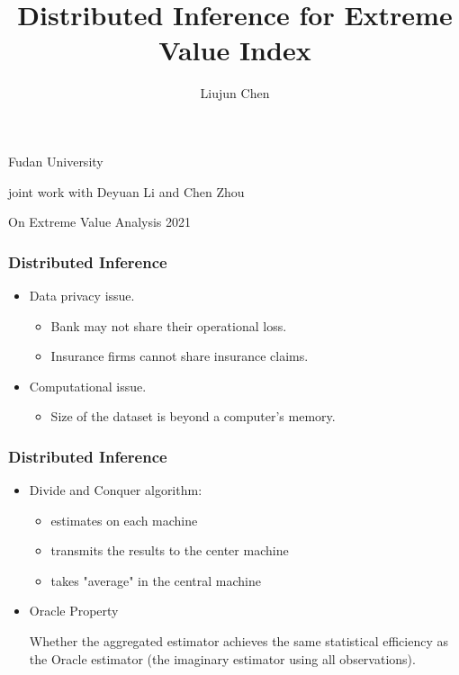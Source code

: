 \documentclass{beamer}
\title{Distributed Inference for Extreme Value Index}
\date{}
\author{Liujun Chen}
\begin{document}
\begin{frame}
\titlepage
\begin{center}
    \vspace{-17ex}


 Fudan University

    \bigskip

    joint work with Deyuan Li and Chen Zhou

    \bigskip
    On Extreme Value Analysis 2021
\end{center}
\end{frame}

\begin{frame}
    \frametitle{ Distributed Inference}

    


\begin{itemize}


    \item Data privacy issue.
    \medskip
    \begin{itemize}
        \item Bank may not share their operational loss.
        \medskip
        \item Insurance firms cannot share insurance claims.
    \end{itemize}
    
    \pause
    \bigskip
    \bigskip
    \item Computational issue.
     \medskip
    \begin{itemize}
        \item Size of the dataset is beyond a computer's memory.
    \end{itemize}
   
\end{itemize}
    

\end{frame}


\begin{frame}
    \frametitle{Distributed Inference}
    \begin{itemize}
        \item Divide and Conquer algorithm:
    \begin{itemize}
        \medskip
        \item estimates on each machine 
        \medskip
        \item transmits the results to the center machine
        \medskip
        \item takes "average" in the central machine
    \end{itemize}
        
        \bigskip
        \pause
        \item {\color{red} Oracle Property}
    
        Whether the aggregated estimator achieves the same statistical efficiency as the {\color{blue} Oracle estimator} (the imaginary estimator using all observations).
    \end{itemize} 
\end{frame}
\end{document}
